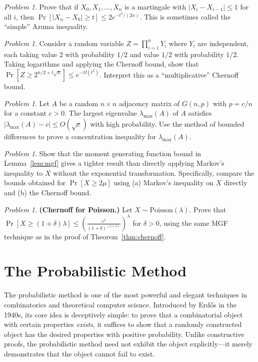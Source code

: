 \documentclass[twoside,12pt]{book}
\theoremstyle{plain}
\theoremstyle{definition}
\theoremstyle{remark}
\newtheorem{problem}[theorem]{Problem}
\begin{document}
\begin{problem}
Prove that if $X_0, X_1, \ldots, X_n$ is a martingale with $|X_i -
X_{i-1}| \leq 1$ for all $i$, then $\Pr[|X_n - X_0| \geq t] \leq
2e^{-t^2/(2n)}$. This is sometimes called the ``simple'' Azuma
inequality.
\end{problem}

\begin{problem}
Consider a random variable $Z = \prod_{i=1}^{n} Y_i$ where $Y_i$ are
independent, each taking value $2$ with probability $1/2$ and value $1/2$
with probability $1/2$. Taking logarithms and applying the Chernoff bound,
show that $\Pr[Z \geq 2^{n/2 + t\sqrt{n}}] \leq e^{-\Omega(t^2)}$.
Interpret this as a ``multiplicative'' Chernoff bound.
\end{problem}

\begin{problem}
Let $A$ be a random $n \times n$ adjacency matrix of $G(n, p)$ with $p =
c/n$ for a constant $c > 0$. The largest eigenvalue $\lambda_{\max}(A)$ of
$A$ satisfies $|\lambda_{\max}(A) - c| \leq O(\sqrt{c})$ with high
probability. Use the method of bounded differences to prove a concentration
inequality for $\lambda_{\max}(A)$.
\end{problem}

\begin{problem}
Show that the moment generating function bound in Lemma~\ref{lem:mgf}
gives a tighter result than directly applying Markov's inequality to $X$
without the exponential transformation. Specifically, compare the bounds
obtained for $\Pr[X \geq 2\mu]$ using (a) Markov's inequality on $X$
directly and (b) the Chernoff bound.
\end{problem}

\begin{problem}
\textbf{(Chernoff for Poisson.)} Let $X \sim \text{Poisson}(\lambda)$.
Prove that $\Pr[X \geq (1+\delta)\lambda] \leq
\left(\frac{e^{\delta}}{(1+\delta)^{(1+\delta)}}\right)^{\lambda}$ for
$\delta > 0$, using the same MGF technique as in the proof of
Theorem~\ref{thm:chernoff}.
\end{problem}


\chapter{The Probabilistic Method}
\label{ch:probabilistic-method}

The probabilistic method is one of the most powerful and elegant techniques
in combinatorics and theoretical computer science. Introduced by
Erd\H{o}s in the 1940s, its core idea is deceptively simple: to prove that
a combinatorial object with certain properties \emph{exists}, it suffices
to show that a randomly constructed object has the desired properties with
positive probability. Unlike constructive proofs, the probabilistic method
need not exhibit the object explicitly---it merely demonstrates that the
object cannot fail to exist.
\end{document}
